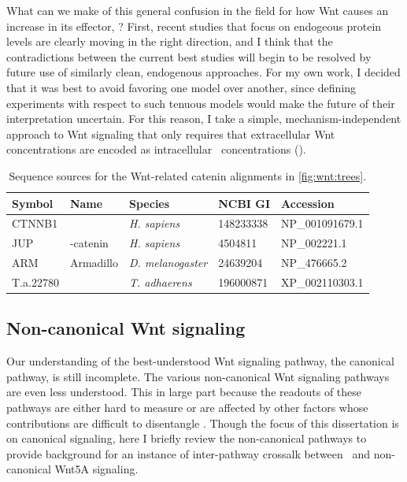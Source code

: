 What can we make of this general confusion in the field for how Wnt
causes an increase in its effector, \bcat? First, recent studies that
focus on endogeous protein levels are clearly moving in the right
direction, and I think that the contradictions between the current
best studies will begin to be resolved by future use of similarly clean, endogenous approaches.
For my own work, I decided that it was best to avoid favoring one
model over another, since defining experiments with respect to such
tenuous models would make the future of their interpretation
uncertain. For this reason, I take a simple, mechanism-independent approach
to Wnt signaling that only requires that extracellular Wnt concentrations
are encoded as intracellular \bcat\ concentrations ().


    \begin{table}[!bt]
    \centering
	\footnotesize
    \caption[List of catenins.]{ Sequence sources for the 
    Wnt-related catenin alignments in \autoref{fig:wnt:trees}. }
    \label{table:pathways:methods:bcat}
    \begin{tabular}{lllll}
    \hline
    Symbol    & Name               & Species & NCBI GI & Accession \\ \hline
	CTNNB1    & \bcat\             & \textit{H. sapiens}      & 148233338 & NP\_001091679.1 \\
	JUP       & \textgamma-catenin & \textit{H. sapiens}      & 4504811   & NP\_002221.1    \\
	ARM       & Armadillo          & \textit{D. melanogaster} & 24639204  & NP\_476665.2    \\
	T.a.22780 &                    & \textit{T. adhaerens}    & 196000871 & XP\_002110303.1 \\
    \hline
    \end{tabular}
    \end{table}

    

    
\subsection{Non-canonical Wnt signaling}
\label{pathways:wnt:noncanon}


Our understanding of the
best-understood Wnt signaling pathway, the canonical pathway, is still
incomplete. The various non-canonical Wnt signaling
pathways are even less understood. This in large part because the readouts
of these pathways
are either hard to measure or are affected by other factors whose contributions are
difficult to disentangle \cite{Angers2009,VanAmerongen2012}.
Though the focus of this dissertation is on canonical signaling, here I briefly
review the non-canonical pathways to provide background for
an instance of inter-pathway crossalk between \tgfbsf\
and non-canonical Wnt5A signaling.


